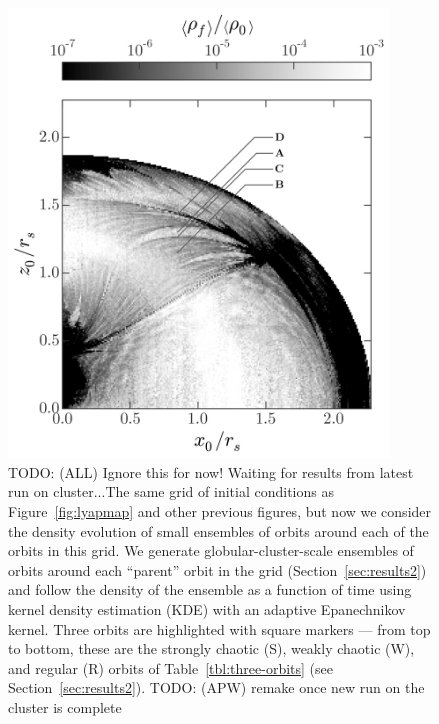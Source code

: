 \documentclass[letterpaper,12pt,preprint]{aastex}
\newcommand{\todo}[2]{{\color{red} TODO: (\MakeUppercase{#1}) #2}}
\begin{document}
\clearpage
\begin{figure}[p]
\begin{center}
\includegraphics[width=0.9\textwidth, trim={0 1cm 0 0}]{figures/ensemble-map.png}
\caption{\todo{all}{Ignore this for now! Waiting for results from latest run on cluster...}The same grid of initial conditions as Figure~\ref{fig:lyapmap} and other previous figures, but now we consider the density evolution of small ensembles of orbits around each of the orbits in this grid. We generate globular-cluster-scale ensembles of orbits around each ``parent'' orbit in the grid (Section~\ref{sec:results2}) and follow the density of the ensemble as a function of time using kernel density estimation (KDE) with an adaptive Epanechnikov kernel. Three orbits are highlighted with square markers --- from top to bottom, these are the strongly chaotic (S), weakly chaotic (W), and regular (R) orbits of Table~\ref{tbl:three-orbits} (see Section~\ref{sec:results2}). \todo{apw}{remake once new run on the cluster is complete}} 
\label{fig:ensemblemap-meandensity}
\end{center}
\end{figure}
\end{document}
